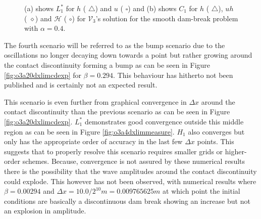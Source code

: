 \documentclass[SingleSpace,12pt,Proceedings]{Serre_ASCE}
\begin{document}
\begin{figure}
	\centering
	\caption{(a) shows $L^*_1$ for $h$ ({\color{red} $\triangle$}) and $u$ ({\color{blue} $\square$}) and (b) shows $C_1$ for $h$ ({\color{red} $\triangle$}), $uh$ ({\color{black} $\diamond$}) and $\mathcal{H}$ ({\color{blue} $\circ$}) for $\mathcal{V}_3$'s solution for the smooth dam-break problem with $\alpha = 0.4$.}
	\label{fig:o3a3dxlimmeasure}
\end{figure}


The fourth scenario will be referred to as the bump scenario due to the oscillations no longer decaying down towards a point but rather growing around the contact discontinuity forming a bump as can be seen in Figure \ref{fig:o3a20dxlimcdexp} for $\beta = 0.294$. This behaviour has hitherto not been published and is certainly not an expected result. 

This scenario is even further from graphical convergence in $\Delta x$ around the contact discontinuity than the previous scenario as can be seen in Figure \ref{fig:o3a20dxlimcdexp}. $L^*_1$ demonstrates good convergence outside this middle region as can be seen in Figure \ref{fig:o3a4dxlimmeasure}. $H_1$ also converges but only has the appropriate order of accuracy in the last few $\Delta x$ points. This suggests that to properly resolve this scenario requires smaller grids or higher-order schemes. Because, convergence is not assured by these numerical results there is the possibility that the wave amplitudes around the contact discontinuity could explode. This however has not been observed, with numerical results where $\beta = 0.00294$ and $\Delta x = 10.0/ 2^{10}m = 0.009765625m$ at which point the initial conditions are basically a discontinuous dam break showing an increase but not an explosion in amplitude.
\end{document}
